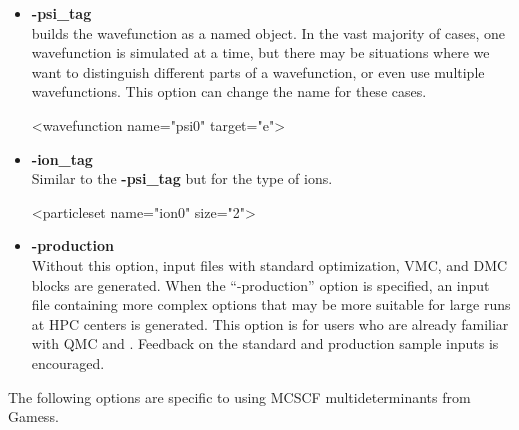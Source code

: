 \begin{itemize}
\item \textbf{-psi\_tag}\\
\qmcpack builds the wavefunction as a named object. In the vast majority of cases, one wavefunction is simulated at a time, but there may be situations where we want to distinguish different parts of a wavefunction, or even use multiple wavefunctions. This option can change the name for these cases. 

\begin{shade}
   <wavefunction name="psi0" target="e">
\end{shade}

\item \textbf{-ion\_tag} \\
Similar to the \textbf{-psi\_tag} but for the type of ions. \\
\begin{shade}
  <particleset name="ion0" size="2">
\end{shade}


\item \textbf{-production}\\

Without this option, input files with standard optimization, VMC, and
DMC blocks are generated. When the ``-production'' option is
specified, an input file containing more complex options that may be
more suitable for large runs at HPC centers is generated. This option
is for users who are already familiar with QMC and \qmcpack. Feedback
on the standard and production sample inputs is encouraged.


\end{itemize}

The following options are specific to using MCSCF multideterminants from Gamess. 

